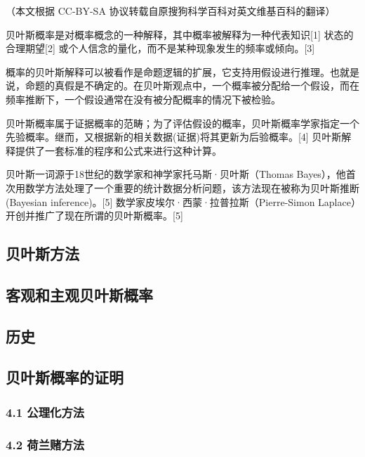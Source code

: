 
（本文根据 CC-BY-SA 协议转载自原搜狗科学百科对英文维基百科的翻译）

贝叶斯概率是对概率概念的一种解释，其中概率被解释为一种代表知识[1] 状态的合理期望[2] 或个人信念的量化，而不是某种现象发生的频率或倾向。[3]

概率的贝叶斯解释可以被看作是命题逻辑的扩展，它支持用假设进行推理。也就是说，命题的真假是不确定的。在贝叶斯观点中，一个概率被分配给一个假设，而在频率推断下，一个假设通常在没有被分配概率的情况下被检验。

贝叶斯概率属于证据概率的范畴；为了评估假设的概率，贝叶斯概率学家指定一个先验概率。继而，又根据新的相关数据(证据)将其更新为后验概率。[4] 贝叶斯解释提供了一套标准的程序和公式来进行这种计算。

贝叶斯一词源于18世纪的数学家和神学家托马斯·贝叶斯（Thomas Bayes），他首次用数学方法处理了一个重要的统计数据分析问题，该方法现在被称为贝叶斯推断(Bayesian inference)。[5] 数学家皮埃尔·西蒙·拉普拉斯（Pierre-Simon Laplace）开创并推广了现在所谓的贝叶斯概率。[5]

\subsection{ 贝叶斯方法}



\subsection{客观和主观贝叶斯概率}



\subsection{历史}



\subsection{贝叶斯概率的证明}



\subsubsection{4.1 公理化方法}



\subsubsection{4.2 荷兰赌方法}



